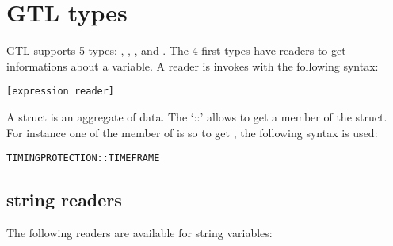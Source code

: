 \section{GTL types}

GTL supports 5 types: , , ,  and . The 4 first types have readers %
to get informations about a variable. A reader is invokes with the following syntax:

\begin{lstlisting}[language=goilTemplate]
[expression reader]
\end{lstlisting}

A struct is an aggregate of data. The `::' allows to get a member of the struct. For instance one of the member of  is  so to get , the following syntax is used:

\begin{lstlisting}[language=goilTemplate]
TIMINGPROTECTION::TIMEFRAME
\end{lstlisting}

\subsection{string readers}

The following readers are available for string variables:

